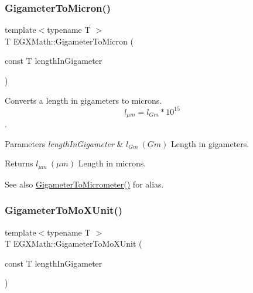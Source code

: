 \subsubsection{\texorpdfstring{Gigameter\+To\+Micron()}{GigameterToMicron()}}
{\footnotesize\ttfamily template$<$typename T $>$ \\
T E\+G\+X\+Math\+::\+Gigameter\+To\+Micron (\begin{DoxyParamCaption}\item[{const T}]{length\+In\+Gigameter }\end{DoxyParamCaption})}



Converts a length in gigameters to microns. \[ l_{\mu m}=l_{Gm} * 10^{15} \]. 


\begin{DoxyParams}{Parameters}
{\em length\+In\+Gigameter} & $ l_{Gm}\ (Gm)$ Length in gigameters. \\
\hline
\end{DoxyParams}
\begin{DoxyReturn}{Returns}
$ l_{\mu m}\ (\mu m)$ Length in microns. 
\end{DoxyReturn}
\begin{DoxySeeAlso}{See also}
\mbox{\hyperlink{group___e_g_x_math-_conversions-_length_conversions-_s_i-_gigameter-_s_i_ga02f73d15581b1cd69a79b843186211f5}{Gigameter\+To\+Micrometer()}} for alias. 
\end{DoxySeeAlso}
\mbox{\label{group___e_g_x_math-_conversions-_length_conversions-_s_i-_gigameter-_non-_s_i_gac30ae06633de77b05d859ffb3cd2a577}} 
\subsubsection{\texorpdfstring{Gigameter\+To\+Mo\+X\+Unit()}{GigameterToMoXUnit()}}
{\footnotesize\ttfamily template$<$typename T $>$ \\
T E\+G\+X\+Math\+::\+Gigameter\+To\+Mo\+X\+Unit (\begin{DoxyParamCaption}\item[{const T}]{length\+In\+Gigameter }\end{DoxyParamCaption})}




